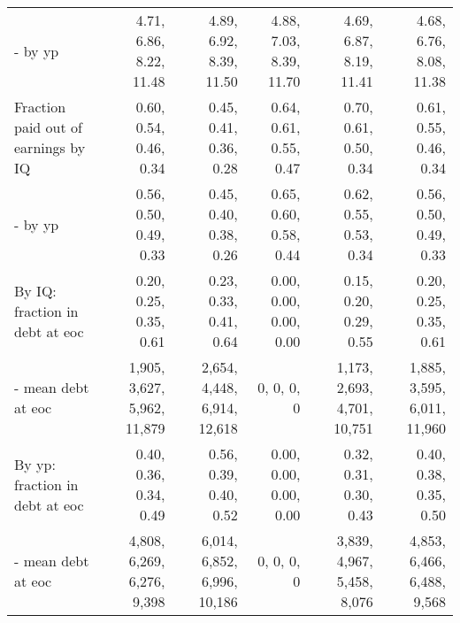 \begin{tabular}{lrrrrr}
- by yp & 4.71, 6.86, 8.22, 11.48  & 4.89, 6.92, 8.39, 11.50  & 4.88, 7.03, 8.39, 11.70  & 4.69, 6.87, 8.19, 11.41  & 4.68, 6.76, 8.08, 11.38  \\ 
Fraction paid out of earnings by IQ & 0.60, 0.54, 0.46, 0.34  & 0.45, 0.41, 0.36, 0.28  & 0.64, 0.61, 0.55, 0.47  & 0.70, 0.61, 0.50, 0.34  & 0.61, 0.55, 0.46, 0.34  \\ 
- by yp & 0.56, 0.50, 0.49, 0.33  & 0.45, 0.40, 0.38, 0.26  & 0.65, 0.60, 0.58, 0.44  & 0.62, 0.55, 0.53, 0.34  & 0.56, 0.50, 0.49, 0.33  \\ 
By IQ: fraction in debt at eoc & 0.20, 0.25, 0.35, 0.61  & 0.23, 0.33, 0.41, 0.64  & 0.00, 0.00, 0.00, 0.00  & 0.15, 0.20, 0.29, 0.55  & 0.20, 0.25, 0.35, 0.61  \\ 
- mean debt at eoc & 1,905, 3,627, 5,962, 11,879  & 2,654, 4,448, 6,914, 12,618  & 0, 0, 0, 0  & 1,173, 2,693, 4,701, 10,751  & 1,885, 3,595, 6,011, 11,960  \\ 
By yp: fraction in debt at eoc & 0.40, 0.36, 0.34, 0.49  & 0.56, 0.39, 0.40, 0.52  & 0.00, 0.00, 0.00, 0.00  & 0.32, 0.31, 0.30, 0.43  & 0.40, 0.38, 0.35, 0.50  \\ 
- mean debt at eoc & 4,808, 6,269, 6,276, 9,398  & 6,014, 6,852, 6,996, 10,186  & 0, 0, 0, 0  & 3,839, 4,967, 5,458, 8,076  & 4,853, 6,466, 6,488, 9,568  \\ 
\hline
\end{tabular}%
